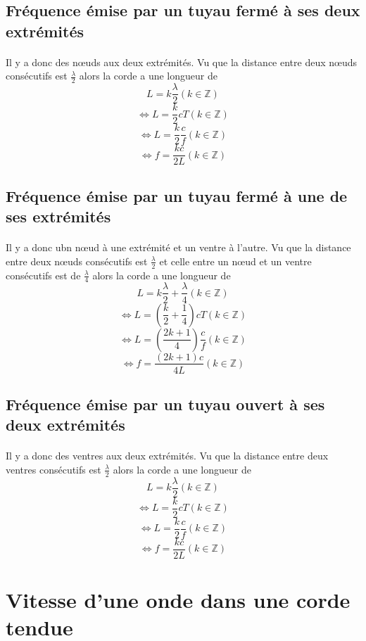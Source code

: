 \documentclass[a4paper]{article}
\begin{document}
\subsection{Fréquence émise par un tuyau fermé à ses deux extrémités}
\paragraph{}Il y a donc des nœuds aux deux extrémités. Vu que la distance entre deux nœuds consécutifs est $\frac{\lambda}{2}$ alors la corde a une longueur de 
\[L=k\frac{\lambda}{2}(k\in\mathbb{Z})\]
\[\Leftrightarrow L=\frac{k}{2}cT(k\in\mathbb{Z})\]
\[\Leftrightarrow L=\frac{k}{2}\frac{c}{f}(k\in\mathbb{Z})\]
\[\Leftrightarrow f=\frac{kc}{2L}(k\in\mathbb{Z})\]
\subsection{Fréquence émise par un tuyau fermé à une de ses extrémités}
\paragraph{}Il y a donc ubn nœud à une extrémité et un ventre à l'autre. Vu que la distance entre deux nœuds consécutifs est $\frac{\lambda}{2}$ et celle entre un nœud et un ventre consécutifs est de $\frac{\lambda}{4}$ alors la corde a une longueur de 
\[L=k\frac{\lambda}{2}+\frac{\lambda}{4}(k\in\mathbb{Z})\]
\[\Leftrightarrow L=\left(\frac{k}{2}+\frac{1}{4}\right)cT(k\in\mathbb{Z})\]
\[\Leftrightarrow L=\left(\frac{2k+1}{4}\right)\frac{c}{f}(k\in\mathbb{Z})\]
\[\Leftrightarrow f=\frac{\left(2k+1\right)c}{4L}(k\in\mathbb{Z})\]
\subsection{Fréquence émise par un tuyau ouvert à ses deux extrémités}
\paragraph{}Il y a donc des ventres aux deux extrémités. Vu que la distance entre deux ventres consécutifs est $\frac{\lambda}{2}$ alors la corde a une longueur de 
\[L=k\frac{\lambda}{2}(k\in\mathbb{Z})\]
\[\Leftrightarrow L=\frac{k}{2}cT(k\in\mathbb{Z})\]
\[\Leftrightarrow L=\frac{k}{2}\frac{c}{f}(k\in\mathbb{Z})\]
\[\Leftrightarrow f=\frac{kc}{2L}(k\in\mathbb{Z})\]
\section{Vitesse d'une onde dans une corde tendue}
\end{document}
